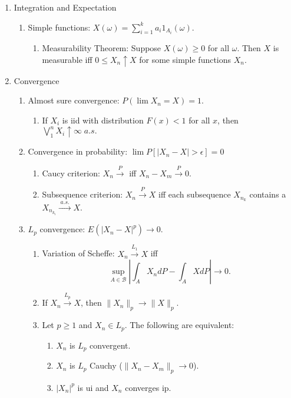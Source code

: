 \documentclass{article}
\newcommand{\mc}[1]{\mathcal{#1}}
\newcommand{\as}{\;a.s.\;}
\newcommand{\pto}{\overset{P}{\to}}
\newcommand{\asto}{\overset{\as}{\to}}
\newcommand{\lpto}{\overset{L_p}{\to}}
\begin{document}
\begin{enumerate}
  \item Integration and Expectation
    \begin{enumerate}
    \item Simple functions: $X(\omega) = \sum_{i=1}^k a_i 1_{A_i}(\omega)$.
      \begin{enumerate}
      \item Measurability Theorem: Suppose $X(\omega) \geq 0$ for all $\omega$. Then $X$ is measurable iff $0 \leq X_n \uparrow X$ for some simple functions $X_n$.
      \end{enumerate}
    \end{enumerate}
  \item Convergence
    \begin{enumerate}
    \item Almost sure convergence: $P(\lim X_n = X) = 1$.
      \begin{enumerate}
      \item If $X_i$ is iid with distribution $F(x) < 1$ for all $x$, then $\bigvee_1^n X_i \uparrow \infty \as$
      \end{enumerate}
    \item Convergence in probability: $\lim P[|X_n - X| > \epsilon] = 0$
      \begin{enumerate}
      \item Caucy criterion: ${X_n} \pto$ iff $X_n - X_m \pto 0$.
      \item Subsequence criterion: $X_n \pto X$ iff each subsequence $X_{n_k}$ contains a $X_{n_{k_i}} \asto X$.
      \end{enumerate}
    \item $L_p$ convergence: $E(|X_n - X|^p) \to 0$.
      \begin{enumerate}
      \item Variation of Scheffe: $X_n \overset{L_1}{\to} X$ iff
        \[
          \underset{A \in \mc{B}}{\sup} | \int_A X_n dP - \int_A X dP| \to 0.
        \]
      \item If $X_n \lpto X$, then $\|X_n\|_p \to \|X\|_p$.
      \item Let $p \geq 1$ and $X_n \in L_p$. The following are equivalent:
        \begin{enumerate}
        \item $X_n$ is $L_p$ convergent.
        \item $X_n$ is $L_p$ Cauchy ($\|X_n - X_m\|_p \to 0$).
        \item $|X_n|^p$ is ui and $X_n$ converges ip.
        \end{enumerate}

\end{enumerate}
\end{enumerate}
\end{enumerate}
\end{document}
